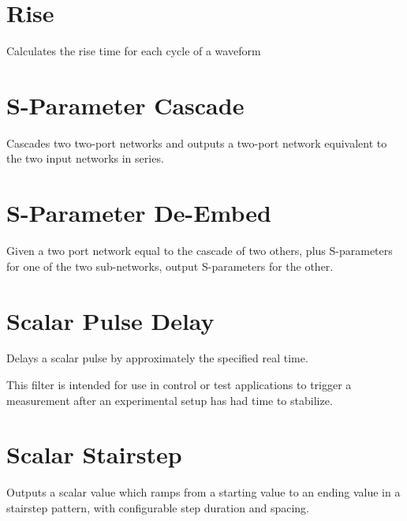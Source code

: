 \pagebreak
\section{Rise}

Calculates the rise time for each cycle of a waveform

\pagebreak
\section{S-Parameter Cascade}
\label{filter:sparamcascade}

Cascades two two-port networks and outputs a two-port network equivalent to the two input networks in series.

\pagebreak
\section{S-Parameter De-Embed}

Given a two port network equal to the cascade of two others, plus S-parameters for one of the two sub-networks, output
S-parameters for the other.

\pagebreak
\section{Scalar Pulse Delay}

Delays a scalar pulse by approximately the specified real time.

This filter is intended for use in control or test applications to trigger a measurement after an experimental setup has
had time to stabilize.

\pagebreak
\section{Scalar Stairstep}

Outputs a scalar value which ramps from a starting value to an ending value in a stairstep pattern, with configurable
step duration and spacing.

